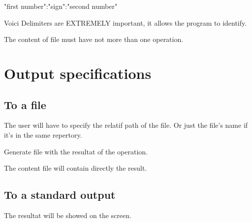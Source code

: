\documentclass[11pt]{report}
\begin{document}
\begin{center}
\begin{bf}"first number":"sign":"second number"\end{bf}
\end{center}
	
\begin{tiny}
    {\normalsize Voici Delimiters are} {\large EXTREMELY} {\normalsize important, it allows the program to identify.}
\end{tiny}

The content of file must have not more than one operation.

  \chapter*{Output specifications}  

  \section{To a file}

    The user will have to specify the relatif path of the file.
Or just the file's name if it's in the same repertory.

Generate file with the resultat of the operation. 

\begin{bf}The content file will contain directly the result.\end{bf}

 \section{To a standard output}

The resultat will be showed on the screen.
\end{document}
